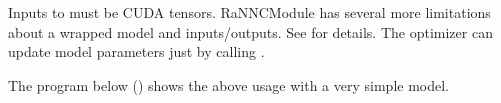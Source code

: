\documentclass[letterpaper,10pt,english]{sphinxmanual}
\begin{document}
\begin{sphinxVerbatim}[commandchars=\\\{\}]
    
  
\end{sphinxVerbatim}

Inputs to  must be CUDA tensors.
RaNNCModule has several more limitations about a wrapped model and inputs/outputs.
See {\hyperref[\detokenize{limitations::doc}]{}} for details.
The optimizer can update model parameters just by calling .

The program below () shows the above usage with a very simple model.
\end{document}
